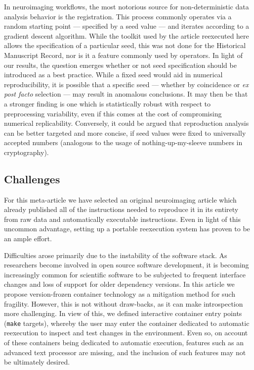 In neuroimaging workflows, the most notorious source for non-deterministic data analysis behavior is the registration.
This process commonly operates via a random starting point — specified by a seed value — and iterates according to a gradient descent algorithm.
While the toolkit used by the article reexecuted here allows the specification of a particular seed, this was not done for the Historical Manuscript Record, nor is it a feature commonly used by operators.
In light of our results, the question emerges whether or not seed specification should be introduced as a best practice.
While a fixed seed would aid in numerical reproducibility, it is possible that a specific seed — whether by coincidence or \textit{ex post facto} selection — may result in anomalous conclusions.
It may then be that a stronger finding is one which is statistically robust with respect to preprocessing variability, even if this comes at the cost of compromising numerical replicability.
Conversely, it could be argued that reproduction analysis can be better targeted and more concise, if seed values were fixed to universally accepted numbers (analogous to the usage of nothing-up-my-sleeve numbers in cryptography).

\subsection{Challenges}
For this meta-article we have selected an original neuroimaging article which already published all of the instructions needed to reproduce it in its entirety from raw data and automatically executable instructions.
Even in light of this uncommon advantage, setting up a portable reexecution system has proven to be an ample effort.

Difficulties arose primarily due to the instability of the software stack.
As researchers become involved in open source software development, it is becoming increasingly common for scientific software to be subjected to frequent interface changes and loss of support for older dependency versions.
In this article we propose version-frozen container technology as a mitigation method for such fragility.
However, this is not without draw-backs, as it can make introspection more challenging.
In view of this, we defined interactive container entry points (\texttt{make} targets), whereby the user may enter the container dedicated to automatic reexecution to inspect and test changes in the environment.
Even so, on account of these containers being dedicated to automatic execution, features such as an advanced text processor are missing, and the inclusion of such features may not be ultimately desired.

